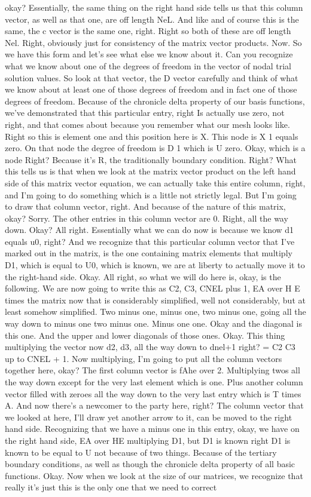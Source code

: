 \documentclass[10pt]{article}
\begin{document}
okay? Essentially, the same thing on the right hand side tells us that this column vector, as well as that one, are off length NeL. And like and of course this is the same, the c vector is the same one, right. Right so both of these are off length Nel. Right, obviously just for consistency of the matrix vector products. Now. So we have this form and let's see what else we know about it. Can you recognize what we know about one of the degrees of freedom in the vector of nodal trial solution values. So look at that vector, the D vector carefully and think of what we know about at least one of those degrees of freedom and in fact one of those degrees of freedom. Because of the chronicle delta property of our basis functions, we've demonstrated that this particular entry, right Is actually use zero, not right, and that comes about because you remember what our mesh looks like. Right so this is element one and this position here is X. This node is X 1 equals zero. On that node the degree of freedom is D 1 which is U zero. Okay, which is a node Right? Because it's R, the traditionally boundary condition. Right? What this tells us is that when we look at the matrix vector product on the left hand side of this matrix vector equation, we can actually take this entire column, right, and I'm going to do something which is a little not strictly legal. But I'm going to draw that column vector, right. And because of the nature of this matrix, okay? Sorry. The other entries in this column vector are 0. Right, all the way down. Okay? All right. Essentially what we can do now is because we know d1 equals u0, right? And we recognize that this particular column vector that I've marked out in the matrix, is the one containing matrix elements that multiply D1, which is equal to U0, which is known, we are at liberty to actually move it to the right-hand side. Okay. All right, so what we will do here is, okay, is the following. We are now going to write this as C2, C3, CNEL plus 1, EA over H E times the matrix now that is considerably simplified, well not considerably, but at least somehow simplified. Two minus one, minus one, two minus one, going all the way down to minus one two minus one. Minus one one. Okay and the diagonal is this one. And the upper and lower diagonals of those ones. Okay. This thing multiplying the vector now d2, d3, all the way down to dnel+1 right? = C2 C3 up to CNEL + 1. Now multiplying, I'm going to put all the column vectors together here, okay? The first column vector is fAhe over 2. Multiplying twos all the way down except for the very last element which is one. Plus another column vector filled with zeroes all the way down to the very last entry which is T times A. And now there's a newcomer to the party here, right? The column vector that we looked at here, I'll draw yet another arrow to it, can be moved to the right hand side. Recognizing that we have a minus one in this entry, okay, we have on the right hand side, EA over HE multiplying D1, but D1 is known right D1 is known to be equal to U not because of two things. Because of the tertiary boundary conditions, as well as though the chronicle delta property of all basic functions. Okay. Now when we look at the size of our matrices, we recognize that really it's just this is the only one that we need to correct 
\end{document}
